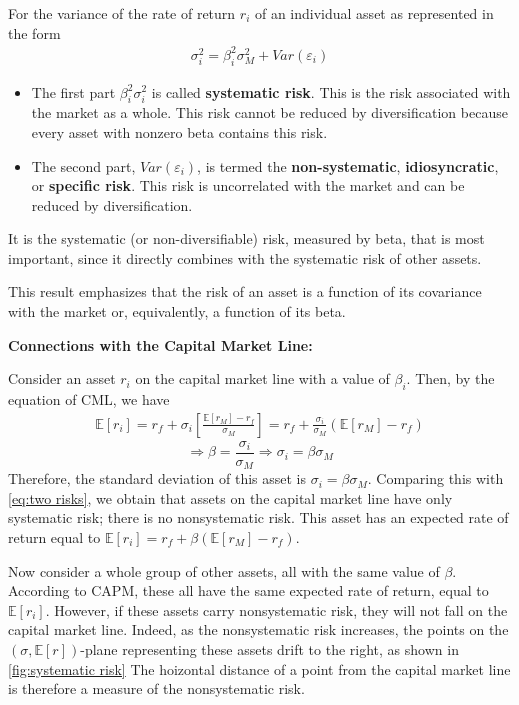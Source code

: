 \documentclass[13pt]{article}
\theoremstyle{definition}
\theoremstyle{remark}
\newenvironment{remark}
  {\pushQED{\qed}\renewcommand{\qedsymbol}{$\triangle$}\remarkx}
  {\popQED\endremarkx}
\newcommand{\EE}{\mathbb{E}}
\begin{document}
For the variance of the rate of return $r_i$ of an individual asset as represented in the form 
\begin{align}
\sigma_i^2 =\beta_{i}^{2} \sigma_{M}^{2}+Var\left(\varepsilon_i\right)\label{eq:two risks}
\end{align}
\begin{itemize}
    \item The first part $\beta_{i}^{2} \sigma_{i}^{2}$ is called \textbf{systematic risk}. This is the risk associated with the market as a whole. This risk cannot be reduced by diversification because every asset with nonzero beta contains this risk. 
    \item The second part, $Var\left(\varepsilon_i\right)$, is termed the \textbf{non-systematic}, \textbf{idiosyncratic}, or \textbf{specific risk}. This risk is uncorrelated with the market and can be reduced by diversification. 
\end{itemize}
It is the systematic (or non-diversifiable) risk, measured by beta, that is most important, since it directly combines with the systematic risk of other assets. 

\begin{remark}
    This result emphasizes that the risk of an asset is a function of its covariance with the market or, equivalently, a function of its beta.
\end{remark}

{\color{C6}\textbf{Connections with the Capital Market Line:}}

Consider an asset $r_i$ on the capital market line with a value of $\beta_i$. Then, by the equation of CML, we have
\begin{align*}
\EE[r_i]=r_{f}+\sigma_i\left[\frac{\EE[r_M]-r_{f}}{\sigma_{M}}\right]
=r_{f}+\frac{\sigma_i}{\sigma_{M}}\left(\EE[r_M]-r_{f}\right)
\end{align*}
\[
 \Longrightarrow \beta = \frac{\sigma_i}{\sigma_{M}} \Longrightarrow \sigma_i=\beta\sigma_{M}
\]
Therefore, the standard deviation of this asset is $\sigma_i=\beta \sigma_M$. Comparing this with \cref{eq:two risks}, we obtain that assets on the capital market line have only systematic risk; there is no nonsystematic risk. This asset has an expected rate of return equal to $\EE[r_i]=r_f+\beta\left(\EE[r_M]-r_f\right)$.

Now consider a whole group of other assets, all with the same value of $\beta$. According to CAPM, these all have the same expected rate of return, equal to $\EE[r_i]$. However, if these assets carry nonsystematic risk, they will not fall on the capital market line. Indeed, as the nonsystematic risk increases, the points on the $(\sigma,\EE[r])$-plane representing these assets drift to the right, as shown in \cref{fig:systematic risk} The hoizontal distance of a point from the capital market line is therefore a measure of the nonsystematic risk.
\end{document}
